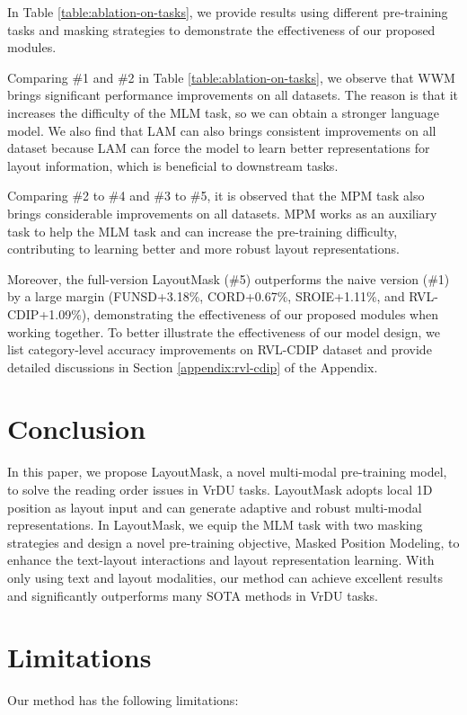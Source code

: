 \documentclass[11pt]{article}
\begin{document}
In Table \ref{table:ablation-on-tasks}, we provide results using different pre-training tasks and masking strategies to demonstrate the effectiveness of our proposed modules. 

Comparing \#1 and \#2 in Table \ref{table:ablation-on-tasks}, we observe that WWM brings significant performance improvements on all datasets. The reason is that it increases the difficulty of the MLM task, so we can obtain a stronger language model.  
We also find that LAM can also brings consistent improvements on all dataset because LAM can force the model to learn better representations for layout information, which is beneficial to downstream tasks. 

Comparing \#2 to \#4 and \#3 to \#5, it is observed that the MPM task also brings considerable improvements on all datasets. MPM works as an auxiliary task to help the MLM task and can increase the pre-training difficulty, contributing to learning better and more robust layout representations.

Moreover, the full-version LayoutMask  (\#5) outperforms the naive version (\#1) by a large margin (FUNSD+3.18\%, CORD+0.67\%, SROIE+1.11\%, and RVL-CDIP+1.09\%), demonstrating the effectiveness of our proposed modules when working together.
To better illustrate the effectiveness of our model design, we list category-level accuracy improvements on RVL-CDIP dataset and provide detailed discussions in Section \ref{appendix:rvl-cdip} of the Appendix.

\section{Conclusion}
In this paper, we propose LayoutMask, a novel multi-modal pre-training model, to solve the reading order issues in VrDU tasks.
LayoutMask adopts local 1D position as layout input and can generate adaptive and robust multi-modal representations.
In LayoutMask, we equip the MLM task with two masking strategies and design a novel pre-training objective, Masked Position Modeling, to enhance the text-layout interactions and layout representation learning. 
With only using text and layout modalities, our method can achieve excellent results and significantly outperforms many SOTA methods in VrDU tasks. 

\section*{Limitations}

Our method has the following limitations:
\end{document}
